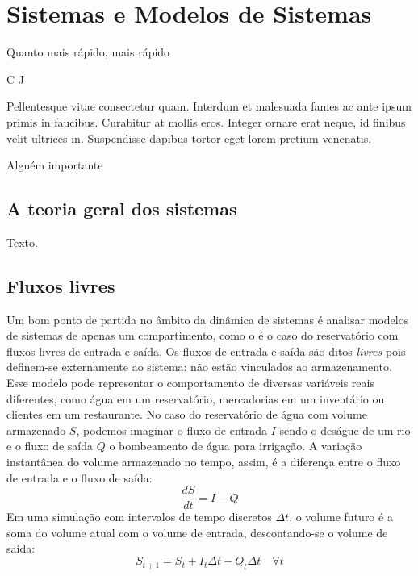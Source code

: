\documentclass[./main.tex]{subfiles}
\begin{document}
\chapter{Sistemas e Modelos de Sistemas} \label{chap:systems}

\epigraph{Quanto mais rápido, mais rápido}{C-J}

\epigraph{Pellentesque vitae consectetur quam. Interdum et malesuada fames ac ante ipsum primis in faucibus. Curabitur at mollis eros. Integer ornare erat neque, id finibus velit ultrices in. Suspendisse dapibus tortor eget lorem pretium venenatis.}{Alguém importante}

\section{A teoria geral dos sistemas}
\par Texto.

\section{Fluxos livres}
\par Um bom ponto de partida no âmbito da dinâmica de sistemas é analisar modelos de sistemas de apenas um compartimento, como o é o caso do reservatório com fluxos livres de entrada e saída. Os fluxos de entrada e saída são ditos \textit{livres} pois definem-se externamente ao sistema: não estão vinculados ao armazenamento. Esse modelo pode representar o comportamento de diversas variáveis reais diferentes, como água em um reservatório, mercadorias em um inventário ou clientes em um restaurante. No caso do reservatório de água com volume armazenado $S$, podemos imaginar o fluxo de entrada $I$ sendo o deságue de um rio e o fluxo de saída $Q$ o bombeamento de água para irrigação. A variação instantânea do volume armazenado no tempo, assim, é a diferença entre o fluxo de entrada e o fluxo de saída:		
\[\frac{dS}{dt} = I - Q \]
Em uma simulação com intervalos de tempo discretos $\Delta t$, o volume futuro é a soma do volume atual com o volume de entrada, descontando-se o volume de saída:
\begin{equation} 
	\label{eq:sis_linear_numerics}
	S_{t+1} = S_{t} + I_{t}\Delta t - Q_{t}\Delta t \quad \forall t
\end{equation} 
\end{document}

